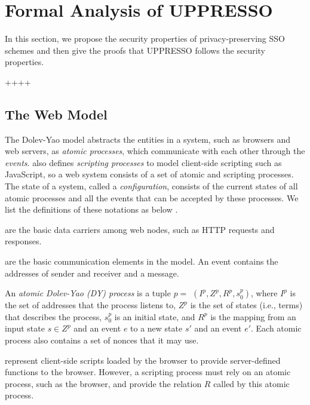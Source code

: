 \section{Formal Analysis of UPPRESSO}
In this section, we propose the security properties of privacy-preserving SSO schemes and then give the proofs that UPPRESSO follows the security properties.

++++


\subsection{The Web Model}
\label{subsec:webmodel}
The Dolev-Yao model abstracts the entities in a system, such as browsers and web servers, as {\em atomic processes}, which communicate with each other through the {\em events}. \cite{SPRESSO} also defines {\em scripting processes} to model client-side scripting such as JavaScript, so a web system consists of a set of atomic and scripting processes. The state of a system, called a {\em configuration}, consists of the current states of all atomic processes and all the events that can be accepted by these processes. We list the definitions of these notations as below \cite{SPRESSO}.

  are the basic data carriers among web nodes, such as HTTP requests and responses.

 are the basic communication elements in the model. An event contains the addresses of sender and receiver and a message.

 An {\em atomic Dolev-Yao (DY) process} is a tuple $p=$ $(I^p, Z^p, R^p,s_0^p )$, where $I^p$ is the set of addresses that the process listens to, $Z^p$ is the set of states (i.e., terms) that describes the process, $s_0^p$ is an initial state, and $R^p$ is the mapping from an input state $s \in Z^p$ and an event $e$ to a new state $s'$ and an event $e'$. %
Each atomic process also contains a set of nonces that it may use.

 represent client-side scripts loaded by the browser to provide server-defined functions to the browser. However, a scripting process must rely on an atomic process, such as the browser, and provide the relation $R$ called by this atomic process.


